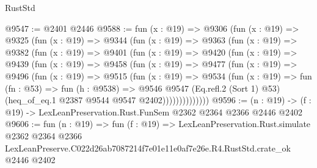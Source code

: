 \begin{lexlean}{RustStd}
\begin{coremodule}
@9547 := @2401 @2446
@9588 := fun (x : @19) =>
  @9306
    (fun (x : @19) =>
    @9325
      (fun (x : @19) =>
      @9344
        (fun (x : @19) =>
        @9363
          (fun (x : @19) =>
          @9382
            (fun (x : @19) =>
            @9401
              (fun (x : @19) =>
              @9420
                (fun (x : @19) =>
                @9439
                  (fun (x : @19) =>
                  @9458
                    (fun (x : @19) =>
                    @9477
                      (fun (x : @19) =>
                      @9496
                        (fun (x : @19) =>
                        @9515
                          (fun (x : @19) =>
                          @9534
                            (fun (x : @19) =>
                            fun (fn : @53) =>
                            fun (h : @9538) =>
                            @9546
                              @9547
                              (Eq.refl.{2} (Sort 1) @53)
                              (heq_of_eq.{1} @2387 @9544 @9547 @2402))))))))))))))
@9596 := (n : @19) -> (f : @19) -> LexLeanPreservation.Rust.FunSem @2362 @2364 @2366 @2446 @2402
@9606 := fun (n : @19) =>
  fun (f : @19) =>
  LexLeanPreservation.Rust.simulate
    @2362
    @2364
    @2366
    LexLeanPreserve.C022d26ab7087214f7e01e11e0af7e26e.R4.RustStd.crate_ok
    @2446
    @2402
\end{coremodule}
\end{lexlean}
